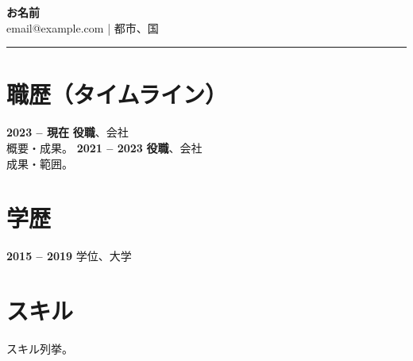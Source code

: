 \documentclass[11pt,a4paper]{article}
\begin{document}
\begin{center}
{\LARGE \textbf{お名前}}\\[0.2em]
email@example.com \quad | \quad 都市、国
\end{center}
\begin{flushright}\rule{2cm}{2.5cm}\end{flushright}
\vspace{0.6em}
\section*{職歴（タイムライン）}
\textbf{2023 -- 現在} \quad \textbf{役職}、会社 \\
概要・成果。
\vspace{0.3em}
\textbf{2021 -- 2023} \quad \textbf{役職}、会社 \\
成果・範囲。
\vspace{0.5em}
\section*{学歴}
\textbf{2015 -- 2019} \quad 学位、大学
\section*{スキル}
スキル列挙。
\end{document}
